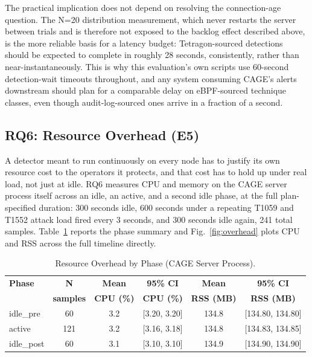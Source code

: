 \documentclass{ieeeaccess}
\begin{document}
The practical implication does not depend on resolving the
connection-age question. The N=20 distribution measurement, which
never restarts the server between trials and is therefore not exposed
to the backlog effect described above, is the more reliable basis for
a latency budget: Tetragon-sourced detections should be expected to
complete in roughly 28 seconds, consistently, rather than
near-instantaneously. This is why this evaluation's own scripts use
60-second detection-wait timeouts throughout, and any system consuming
CAGE's alerts downstream should plan for a comparable delay on
eBPF-sourced technique classes, even though audit-log-sourced ones
arrive in a fraction of a second.

\subsection{RQ6: Resource Overhead (E5)}
\label{subsec:rq6}

A detector meant to run continuously on every node has to justify its
own resource cost to the operators it protects, and that cost has to
hold up under real load, not just at idle. RQ6 measures CPU and memory
on the CAGE server process itself across an idle, an active, and a
second idle phase, at the full plan-specified duration: 300 seconds
idle, 600 seconds under a repeating T1059 and T1552 attack load fired
every 3 seconds, and 300 seconds idle again, 241 total samples. Table~\ref{tab:overhead}
reports the phase summary and Fig.~\ref{fig:overhead} plots CPU and RSS across the
full timeline directly.

\begin{table}[!t]
\centering
\caption{Resource Overhead by Phase (CAGE Server Process).}
\label{tab:overhead}
\tablebodyfont
\setlength{\tabcolsep}{2.5pt}
\begin{tabular}{@{}lccccc@{}}
\toprule
\textbf{Phase} & \textbf{N} & \textbf{Mean} & \textbf{95\% CI} & \textbf{Mean} & \textbf{95\% CI} \\
& \textbf{samples} & \textbf{CPU (\%)} & \textbf{CPU (\%)} & \textbf{RSS (MB)} & \textbf{RSS (MB)} \\
\midrule
idle\_pre & 60 & 3.2 & [3.20, 3.20] & 134.8 & [134.80, 134.80] \\
active & 121 & 3.2 & [3.16, 3.18] & 134.8 & [134.83, 134.85] \\
idle\_post & 60 & 3.1 & [3.10, 3.10] & 134.9 & [134.90, 134.90] \\
\bottomrule
\end{tabular}
\end{table}
\end{document}
